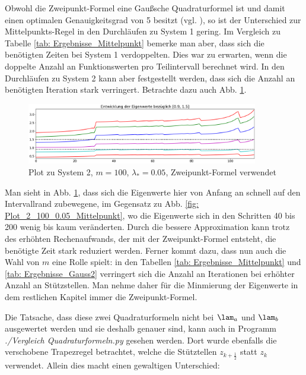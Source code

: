 \documentclass[a4paper,12pt]{report}
\newcommand{\zitat}[1]{\glqq #1\grqq}
\newcommand{\1}{\mathds{1}}
\theoremstyle{plain} %
\theoremstyle{definition} %
\theoremstyle{remark}
\begin{document}
            Obwohl die Zweipunkt-Formel eine \zitat{Gaußsche Quadraturformel}\cite[S. 523]{numerikHermann} ist
            und damit einen optimalen Genauigkeitsgrad von 5 besitzt (vgl. \cite[S. 522f.]{numerikHermann}),
            so ist der Unterschied zur Mittelpunkts-Regel in den Durchläufen zu System 1 gering.
            Im Vergleich zu Tabelle \ref{tab: Ergebnisse_Mittelpunkt} bemerke man aber, dass sich die benötigten Zeiten bei System 1 verdoppelten.
            Dies war zu erwarten, wenn die doppelte Anzahl an Funktionswerten pro Teilintervall berechnet wird.
            In den Durchläufen zu System 2 kann aber festgestellt werden, dass sich die Anzahl an benötigten Iteration stark verringert.
            Betrachte dazu auch Abb. \ref{fig: Plot_2_100_0.05_Gauss2}.
            \begin{figure}[h!t]
                  \centering
                  \includegraphics[width=0.9\textwidth, keepaspectratio]{./Gauss2/Plot_2_100_0.05.png}
                  \caption[Plot zu System 2, $m=100$, $\lambda_*=0.05$, Zweipunkt-Formel]{Plot zu System 2, $m=100$, $\lambda_*=0.05$, Zweipunkt-Formel verwendet}
                  \label{fig: Plot_2_100_0.05_Gauss2}
            \end{figure}

            Man sieht in Abb. \ref{fig: Plot_2_100_0.05_Gauss2}, dass sich die Eigenwerte hier von Anfang an schnell auf den Intervallrand zubewegene,
            im Gegensatz zu Abb. \ref{fig: Plot_2_100_0.05_Mittelpunkt}, wo die Eigenwerte sich in den Schritten 40 bis 200 wenig bis kaum veränderten.
            Durch die bessere Approximation kann trotz des erhöhten Rechenaufwands, der mit der Zweipunkt-Formel entsteht, die benötigte Zeit stark reduziert werden.
            Ferner kommt dazu, dass nun auch die Wahl von $m$ eine Rolle spielt: in den Tabellen \ref{tab: Ergebnisse_Mittelpunkt} 
            und \ref{tab: Ergebnisse_Gauss2} verringert sich die Anzahl an Iterationen bei erhöhter Anzahl an Stützstellen.
            Man nehme daher für die Minmierung der Eigenwerte in dem restlichen Kapitel immer die Zweipunkt-Formel.

            Die Tatsache, dass diese zwei Quadraturformeln nicht bei $\lam_a$ und $\lam_b$ ausgewertet werden und sie deshalb genauer sind,
            kann auch in Programm \textit{./Vergleich Quadraturformeln.py} gesehen werden.
            Dort wurde ebenfalls die verschobene Trapezregel betrachtet, welche die Stütztellen $z_{k+\frac 1 2}$ statt $z_k$ verwendet.
            Allein dies macht einen gewaltigen Unterschied:
\end{document}

